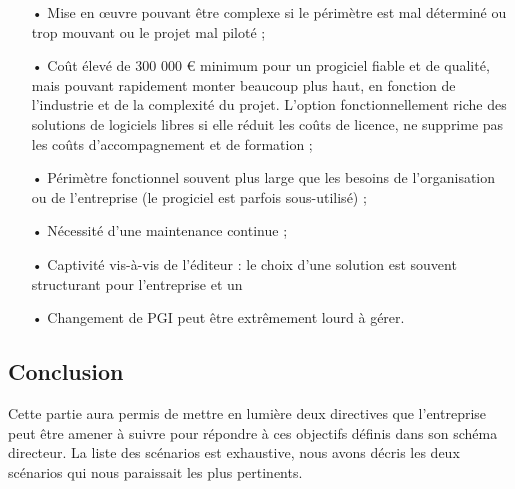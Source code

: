 \begin{itemize}
\item[•] Mise en œuvre pouvant être complexe si le périmètre est mal déterminé ou trop mouvant ou le projet mal piloté ;
\item[•] Coût élevé de 300 000 € minimum pour un progiciel fiable et de qualité, mais pouvant rapidement monter beaucoup plus haut, en fonction de l'industrie et de la complexité du projet. L'option fonctionnellement riche des solutions de logiciels libres si elle réduit les coûts de licence, ne supprime pas les coûts d'accompagnement et de formation ;
\item[•]Périmètre fonctionnel souvent plus large que les besoins de l'organisation ou de l'entreprise (le progiciel est parfois sous-utilisé) ;
\item[•]Nécessité d'une maintenance continue ;
\item[•]Captivité vis-à-vis de l'éditeur : le choix d'une solution est souvent structurant pour l'entreprise et un \item[•]Changement de PGI peut être extrêmement lourd à gérer.
\end{itemize}

\subsection{Conclusion}
Cette partie aura permis de mettre en lumière deux directives que l'entreprise peut être amener à suivre pour répondre à ces objectifs définis dans son schéma directeur. La liste des scénarios est exhaustive, nous avons décris les deux scénarios qui nous paraissait les plus pertinents.   